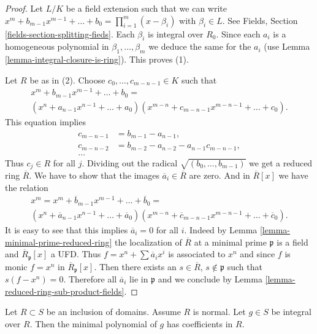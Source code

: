 \begin{proof}
Let $L/K$ be a field extension such that we can write
$x^m + b_{m - 1} x^{m - 1} + \ldots + b_0 =
\prod_{i = 1}^m (x - \beta_i)$ with $\beta_i \in L$.
See Fields, Section \ref{fields-section-splitting-fieds}.
Each $\beta_i$ is integral over $R_0$.
Since each $a_i$ is a homogeneous polynomial in $\beta_1, \ldots, \beta_m$
we deduce the same for the $a_i$
(use Lemma \ref{lemma-integral-closure-is-ring}). This proves (1).

\medskip\noindent
Let $R$ be as in (2). Choose $c_0, \ldots, c_{m - n - 1} \in K$ such that
$$
\begin{matrix}
x^m + b_{m - 1} x^{m - 1} + \ldots + b_0 =  \\
(x^n + a_{n - 1}x^{n - 1} + \ldots + a_0)
(x^{m - n} + c_{m - n - 1}x^{m - n - 1}+ \ldots + c_0).
\end{matrix}
$$
This equation implies
\begin{align*}
c_{m - n - 1} & = b_{m - 1} - a_{n - 1}, \\
c_{m - n - 2} & = b_{m - 2} - a_{n - 2} - a_{n - 1}c_{m - n - 1}, \\
\ldots
\end{align*}
Thus $c_j \in R$ for all $j$. Dividing out the radical
$\sqrt{(b_0, \ldots, b_{m - 1})}$ we get a reduced ring $\overline{R}$.
We have to show that the images $\overline{a}_i \in \overline{R}$
are zero. And in
$\overline{R}[x]$ we have the relation
$$
\begin{matrix}
x^m = x^m + \overline{b}_{m - 1} x^{m - 1} + \ldots + \overline{b}_0 = \\
(x^n + \overline{a}_{n - 1}x^{n - 1} + \ldots + \overline{a}_0)
(x^{m - n} + \overline{c}_{m - n - 1}x^{m - n - 1}+ \ldots + \overline{c}_0).
\end{matrix}
$$
It is easy to see that this implies $\overline{a}_i = 0$ for all $i$. Indeed
by Lemma \ref{lemma-minimal-prime-reduced-ring} the localization of
$\overline{R}$ at a minimal prime $\mathfrak{p}$ is a field and
$\overline{R}_{\mathfrak p}[x]$ a UFD. Thus
$f = x^n + \sum \overline{a}_i x^i$
is associated to $x^n$ and since $f$ is monic $f = x^n$
in $\overline{R}_{\mathfrak p}[x]$.
Then there exists an $s \in \overline{R}$, $s \not\in \mathfrak p$
such that $s(f - x^n) = 0$.  Therefore all $\overline{a}_i$ lie
in $\mathfrak p$ and we conclude by
Lemma \ref{lemma-reduced-ring-sub-product-fields}.
\end{proof}

\begin{lemma}
\label{lemma-minimal-polynomial-normal-domain}
Let $R \subset S$ be an inclusion of domains.
Assume $R$ is normal. Let $g \in S$ be integral
over $R$. Then the minimal polynomial of $g$
has coefficients in $R$.
\end{lemma}

